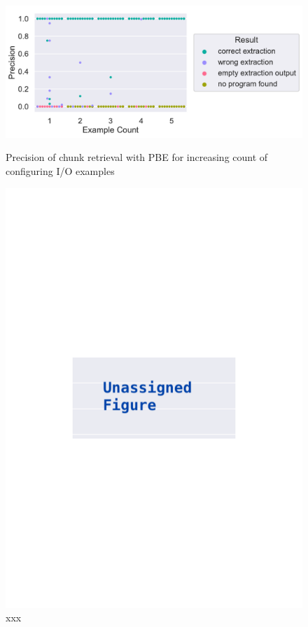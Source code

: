 \documentclass[\myrootdir/main.tex]{subfiles}
\begin{document}
\begin{figure}[htbp]
	\centering
	\begin{minipage}{0.45\textwidth}
		\centering
		\includegraphics[width=\textwidth, clip]{img/big-study/precision-extraction-result-PBE.pdf}
		\caption{Precision of chunk retrieval with PBE for increasing count of configuring I/O examples}
		\label{fig:precision-extraction-result-PBE}
	\end{minipage}\hfill
	\begin{minipage}{0.45\textwidth}
		\centering
		\includegraphics[width=\textwidth, clip]{img/big-study/xxx.pdf}
		\caption{xxx}
		\label{fig:xxx}
	\end{minipage}
\end{figure}
\end{document}
